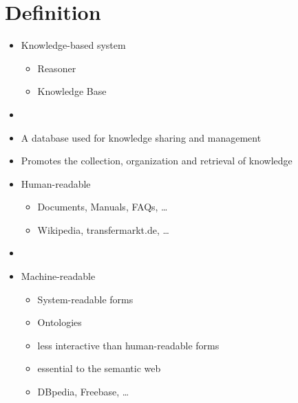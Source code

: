 \section{Definition}

\begin{frame}

\begin{itemize}
  \item Knowledge-based system
  \begin{itemize}
    \item Reasoner
    \item Knowledge Base
  \end{itemize}
  \item
	\item A database used for knowledge sharing and management
	\item Promotes the collection, organization and retrieval of knowledge
\end{itemize}

\end{frame}

\begin{frame}

\begin{itemize}
    \item Human-readable
    \begin{itemize}
      \item Documents, Manuals, FAQs, \ldots
      \item Wikipedia, transfermarkt.de, \ldots
    \end{itemize}
    \item
    \item Machine-readable
    \begin{itemize}
      \item System-readable forms
      \item Ontologies
      \item less interactive than human-readable forms
      \item essential to the semantic web
      \item DBpedia, Freebase, \ldots
    \end{itemize}
    
\end{itemize}

\end{frame}